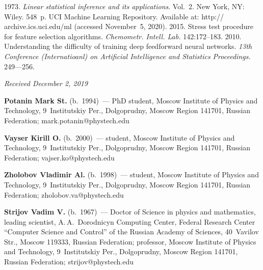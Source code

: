 \begin{multicols}{2}
{{\begin{thebibliography}{99}
 1973. \textit{Linear statistical inference and its applications}. Vol.~2. New York, 
NY: Wiley. 548~p.
UCI Machine Learning Repository. Available at: {\sf http:// archive.ics.uci.edu/ml} (accessed 
November~5, 2020).
 2015. Stress test procedure for feature selection algorithms. 
\textit{Chemometr. Intell. Lab.} 142:172--183.
 2010. Understanding the difficulty of training deep feedforward 
neural networks. \textit{13th Conference (Internatioanl) on Artificial Intelligence and Statistics 
Proceedings.} 
249---256.
\end{thebibliography}

 }
 }

\end{multicols}

\vspace*{-11pt}

\hfill{\small\textit{Received December 2, 2019}}

\pagebreak



\Contr

\noindent
\textbf{Potanin Mark St.} (b.\ 1994)~--- PhD student, Moscow Institute of Physics and Technology,  
9~Institutskiy Per., Dolgoprudny, Moscow Region 141701, Russian Federation; 
\mbox{mark.potanin@phystech.edu}

\vspace*{5pt}

\noindent
\textbf{Vayser Kirill O.} (b.\ 2000)~--- student, Moscow Institute of Physics and Technology, 
9~Institutskiy Per., Dolgoprudny, Moscow Region 141701, Russian Federation; 
\mbox{vajser.ko@phystech.edu}

\vspace*{5pt}

\noindent
\textbf{Zholobov Vladimir Al.} (b.\ 1998)~--- student, Moscow Institute of Physics and Technology, 
9~Institutskiy Per., Dolgoprudny, Moscow Region 141701, Russian Federation; 
\mbox{zholobov.va@phystech.edu}

\vspace*{5pt}

\noindent
\textbf{Strijov Vadim V.} (b.\ 1967)~--- Doctor of Science in physics and mathematics, leading scientist, 
A.\,A.~Dorodnicyn Computing Center, Federal Research Center ``Computer Science and Control'' of 
the Russian Academy of Sciences, 40~Vavilov Str., Moscow 119333, Russian Federation; professor, 
Moscow Institute of Physics and Technology, 9~Institutskiy Per., Dolgoprudny, Moscow Region 141701, 
Russian Federation; \mbox{strijov@phystech.edu}\

\label{end\stat}

\renewcommand{\bibname}{\protect\rm Литература} 
      